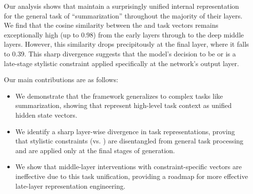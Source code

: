 Our analysis shows that \fvsabbr maintain a surprisingly unified internal representation for the general task of ``summarization'' throughout the majority of their layers. We find that the cosine similarity between the \extractive and \abstractive task vectors remains exceptionally high (up to $0.98$) from the early layers through to the deep middle layers. However, this similarity drops precipitously at the final layer, where it falls to $0.39$. This sharp divergence suggests that the model's decision to be \extractive or \abstractive is a late-stage stylistic constraint applied specifically at the network's output layer.

Our main contributions are as follows:
\begin{itemize}[leftmargin=*,itemsep=0pt,topsep=0pt]
    \item We demonstrate that the \fv framework generalizes to complex tasks like summarization, showing that \fvsabbr represent high-level task context as unified hidden state vectors.
    \item We identify a sharp layer-wise divergence in task representations, proving that stylistic constraints (\extractive vs. \abstractive) are disentangled from general task processing and are applied only at the final stages of generation.
    \item We show that middle-layer interventions with constraint-specific vectors are ineffective due to this task unification, providing a roadmap for more effective late-layer representation engineering.
\end{itemize}
